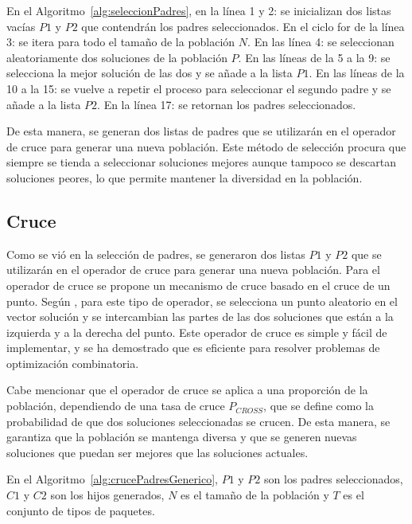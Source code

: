 En el Algoritmo~\ref{alg:seleccionPadres}, en la línea 1 y 2: se inicializan dos listas vacías $P1$ y $P2$ que contendrán los padres seleccionados. En el ciclo for de la línea 3: se itera para todo el tamaño de la población $N$. En las línea 4: se seleccionan aleatoriamente dos soluciones de la población $P$. En las líneas de la 5 a la 9: se selecciona la mejor solución de las dos y se añade a la lista $P1$. En las líneas de la 10 a la 15: se vuelve a repetir el proceso para seleccionar el segundo padre y se añade a la lista $P2$. En la línea 17: se retornan los padres seleccionados.

De esta manera, se generan dos listas de padres que se utilizarán en el operador de cruce para generar una nueva población. Este método de selección procura que siempre se tienda a seleccionar soluciones mejores aunque tampoco se descartan soluciones peores, lo que permite mantener la diversidad en la población.

\subsection{Cruce}

Como se vió en la selección de padres, se generaron dos listas $P1$ y $P2$ que se utilizarán en el operador de cruce para generar una nueva población. Para el operador de cruce se propone un mecanismo de cruce basado en el cruce de un punto. Según \textcite{Umbarkar2015}, para este tipo de operador, se selecciona un punto aleatorio en el vector solución y se intercambian las partes de las dos soluciones que están a la izquierda y a la derecha del punto. Este operador de cruce es simple y fácil de implementar, y se ha demostrado que es eficiente para resolver problemas de optimización combinatoria.

Cabe mencionar que el operador de cruce se aplica a una proporción de la población, dependiendo de una tasa de cruce $P_{CROSS}$, que se define como la probabilidad de que dos soluciones seleccionadas se crucen. De esta manera, se garantiza que la población se mantenga diversa y que se generen nuevas soluciones que puedan ser mejores que las soluciones actuales.

En el Algoritmo~\ref{alg:crucePadresGenerico}, $P1$ y $P2$ son los padres seleccionados, $C1$ y $C2$ son los hijos generados, $N$ es el tamaño de la población y $T$ es el conjunto de tipos de paquetes.

